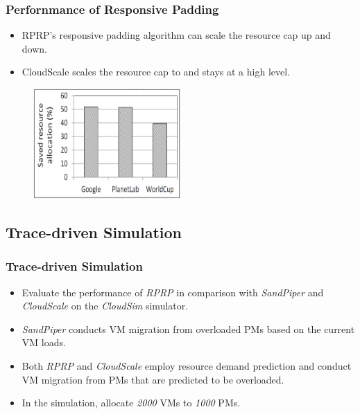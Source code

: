 \documentclass{beamer}
\begin{document}
	\begin{frame}
	\frametitle{Perfornmance of Responsive Padding}
		\begin{itemize}
		\item RPRP's responsive padding algorithm can scale the resource cap up and down.
		\item CloudScale scales the resource cap to and stays at a high level.
		\end{itemize}
		\begin{figure}[h!]
		\centering
		\includegraphics[width=0.5\textwidth]{./figure/eva1_6.PNG}
		\end{figure}
	\end{frame}

\subsection{Trace-driven Simulation}
	\begin{frame}
	\frametitle{Trace-driven Simulation}
		\begin{itemize}
		\item Evaluate the performance of {\it RPRP} in comparison with {\it SandPiper} and {\it CloudScale} on the {\it CloudSim} simulator.
		\item {\it SandPiper} conducts VM migration from overloaded PMs based on the current VM loads.
		\item Both {\it RPRP} and {\it CloudScale} employ resource demand prediction and conduct VM migration from PMs that are predicted to be overloaded.
		\item In the simulation, allocate {\it 2000} VMs to {\it 1000} PMs.
		\end{itemize}
	\end{frame}
\end{document}
